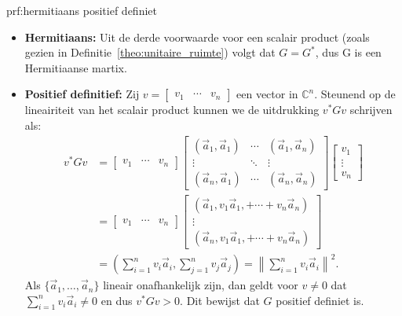 \begin{prf}{prf:hermitiaans positief definiet}
    \begin{itemize}
        \item 
            \textbf{Hermitiaans:} Uit de derde voorwaarde voor een scalair product (zoals gezien in Definitie~\ref{theo:unitaire_ruimte}) volgt dat $G = G^*$, dus G is een Hermitiaanse martix.
        \item 
            \textbf{Positief definitief:} Zij $v = \begin{bmatrix}
                v_1 & \cdots & v_n
            \end{bmatrix}$
            een vector in $\mathbb{C}^n$. Steunend op de lineairiteit van het scalair product kunnen we de uitdrukking $v^*Gv$ schrijven als:
            \begin{align*}
                v^*Gv 
                    &= \begin{bmatrix}
                        v_1 & \cdots & v_n
                    \end{bmatrix}
                    \begin{bmatrix}
                        (\vec{a}_1,\vec{a}_1) & \cdots & (\vec{a}_1,\vec{a}_n) \\
                        \vdots & \ddots & \vdots \\
                        (\vec{a}_n,\vec{a}_1) & \cdots & (\vec{a}_n,\vec{a}_n)
                    \end{bmatrix}
                    \begin{bmatrix}
                        v_1 \\ \vdots \\ v_n
                    \end{bmatrix} \\
                    &= \begin{bmatrix}
                        v_1 & \cdots & v_n
                    \end{bmatrix}
                    \begin{bmatrix}
                        (\vec{a}_1, v_1\vec{a}_1, + \cdots + v_n\vec{a}_n) \\
                        \vdots \\
                        (\vec{a}_n, v_1\vec{a}_1, + \cdots + v_n\vec{a}_n)
                    \end{bmatrix} \\
                    &= \left(\sum_{i=1}^n v_i\vec{a}_i, \sum_{j=1}^n v_j\vec{a}_j\right) = \left\| \sum_{i=1}^n v_i\vec{a}_i \right\|^2.
            \end{align*}
            Als $\{\vec{a}_1,\ldots,\vec{a}_n\}$ lineair onafhankelijk zijn, dan geldt voor $v\neq 0$ dat $\sum_{i=1}^n v_i\vec{a}_i \neq 0$ en dus $v^*Gv > 0$. Dit bewijst dat $G$ positief definiet is.
    \end{itemize}
\end{prf}


